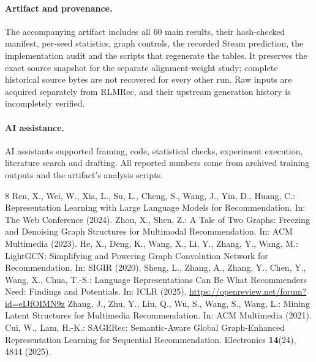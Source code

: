 \documentclass[runningheads]{llncs}
\begin{document}
\paragraph{Artifact and provenance.} The accompanying artifact includes all
60 main results, their hash-checked manifest, per-seed statistics, graph
controls, the recorded Steam prediction, the implementation audit and the
scripts that regenerate the tables. It preserves the exact source snapshot
for the separate alignment-weight study; complete historical source bytes
are not recovered for every other run. Raw inputs are acquired separately
from RLMRec, and their upstream generation history is incompletely verified.

\paragraph{AI assistance.} AI assistants supported framing, code, statistical
checks, experiment execution, literature search and drafting. All reported
numbers come from archived training outputs and the artifact's analysis scripts.

\clearpage
\begin{thebibliography}{8}
 Ren, X., Wei, W., Xia, L., Su, L., Cheng, S., Wang, J., Yin, D.,
Huang, C.: Representation Learning with Large Language Models for Recommendation.
In: The Web Conference (2024). 
 Zhou, X., Shen, Z.: A Tale of Two Graphs: Freezing and Denoising
Graph Structures for Multimodal Recommendation. In: ACM Multimedia (2023).
 He, X., Deng, K., Wang, X., Li, Y., Zhang, Y., Wang, M.:
LightGCN: Simplifying and Powering Graph Convolution Network for Recommendation.
In: SIGIR (2020). 
 Sheng, L., Zhang, A., Zhang, Y., Chen, Y., Wang, X., Chua, T.-S.:
Language Representations Can Be What Recommenders Need: Findings and Potentials.
In: ICLR (2025). \url{https://openreview.net/forum?id=eIJfOIMN9z}
 Zhang, J., Zhu, Y., Liu, Q., Wu, S., Wang, S., Wang, L.:
Mining Latent Structures for Multimedia Recommendation. In: ACM Multimedia (2021).
 Cui, W., Lam, H.-K.: SAGERec: Semantic-Aware Global Graph-Enhanced Representation
Learning for Sequential Recommendation. Electronics \textbf{14}(24), 4844 (2025).
\end{thebibliography}
\end{document}
